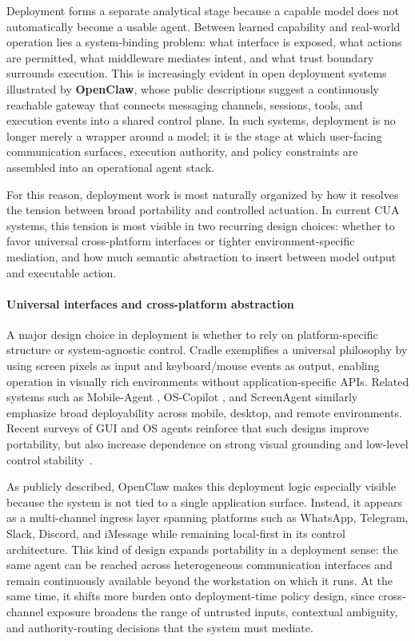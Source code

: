 Deployment forms a separate analytical stage because a capable model does not automatically become a usable agent. Between learned capability and real-world operation lies a system-binding problem: what interface is exposed, what actions are permitted, what middleware mediates intent, and what trust boundary surrounds execution. This is increasingly evident in open deployment systems illustrated by \textbf{OpenClaw}, whose public descriptions suggest a continuously reachable gateway that connects messaging channels, sessions, tools, and execution events into a shared control plane. In such systems, deployment is no longer merely a wrapper around a model; it is the stage at which user-facing communication surfaces, execution authority, and policy constraints are assembled into an operational agent stack.

For this reason, deployment work is most naturally organized by how it resolves the tension between broad portability and controlled actuation. In current CUA systems, this tension is most visible in two recurring design choices: whether to favor universal cross-platform interfaces or tighter environment-specific mediation, and how much semantic abstraction to insert between model output and executable action.

\paragraph{Universal interfaces and cross-platform abstraction}
A major design choice in deployment is whether to rely on platform-specific structure or system-agnostic control. Cradle \cite{tan2024cradle} exemplifies a universal philosophy by using screen pixels as input and keyboard/mouse events as output, enabling operation in visually rich environments without application-specific APIs. Related systems such as Mobile-Agent \cite{wang2024mobile}, OS-Copilot \cite{wu2024copilot}, and ScreenAgent \cite{niu2024screenagent} similarly emphasize broad deployability across mobile, desktop, and remote environments. Recent surveys of GUI and OS agents reinforce that such designs improve portability, but also increase dependence on strong visual grounding and low-level control stability~\cite{tang2025survey,hu2025agents}.

As publicly described, OpenClaw makes this deployment logic especially visible because the system is not tied to a single application surface. Instead, it appears as a multi-channel ingress layer spanning platforms such as WhatsApp, Telegram, Slack, Discord, and iMessage while remaining local-first in its control architecture. This kind of design expands portability in a deployment sense: the same agent can be reached across heterogeneous communication interfaces and remain continuously available beyond the workstation on which it runs. At the same time, it shifts more burden onto deployment-time policy design, since cross-channel exposure broadens the range of untrusted inputs, contextual ambiguity, and authority-routing decisions that the system must mediate.

